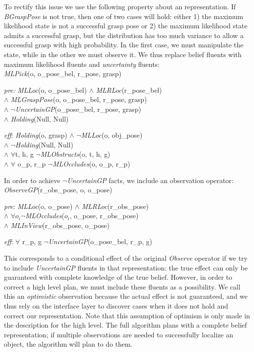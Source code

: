 To rectify this issue we use the following property about an \mld{}
representation. If \emph{BGraspPose} is not true, then one of two
cases will hold: either 1) the maximum likelihood state is not a
successful grasp pose or 2) the maximum likelihood state admits a
successful grasp, but the distribution has too much variance to allow
a successful grasp with high probability. In the first case, we must
manipulate the state, while in the other we must observe it. We
thus replace belief fluents with maximum likelihood fluents and
\emph{uncertainty} fluents:\\
\emph{MLPick}(o, o\_pose\_bel, r\_pose, grasp)
\begin{tightlist}
\item[\emph{pre:}] \emph{MLLoc}(o, o\_pose\_bel) $\wedge$
  \emph{MLRLoc}(r\_pose\_bel) \\$\wedge$ \emph{MLGraspPose}(o,
  o\_pose\_bel, r\_pose, grasp) \\$\wedge$
  $\lnot$\emph{UncertainGP}(o\_pose\_bel, r\_pose, grasp)\\$\wedge$
  \emph{Holding}(Null, Null)
\item[\emph{eff}:] \emph{Holding}(o, grasp) $\wedge$
  $\lnot$\emph{MLLoc}(o, obj\_pose) \\$\wedge$
  $\lnot$\emph{Holding}(Null, Null) \\$\wedge$ $\forall$t, h, g
  $\lnot$\emph{MLObstructs}(o, t, h, g)\\ $\wedge$ $\forall$ o\_p,
  r\_p $\lnot$\emph{MLOccludes}(o, o\_p, r\_p)
\end{tightlist}
In order to achieve $\lnot$\emph{UncertainGP} facts, we include an
observation operator:\\
\emph{ObserveGP}(r\_obs\_pose, o, o\_pose)
\begin{tightlist}
  \item[\emph{pre}:] \emph{MLLoc}(o, o\_pose) $\wedge$
    \emph{MLRLoc}(r\_obs\_pose) \\$\wedge$ $\forall o_i
    \lnot$\emph{MLOccludes}($o_i$, o\_pose, r\_obs\_pose) \\ $\wedge$
    \emph{MLInView}(r\_obs\_pose, o\_pose)
  \item[\emph{eff}:] $\forall$ r\_p, g $\lnot$\emph{UncertainGP}(o\_pose\_bel, r\_p, g)
\end{tightlist}
This corresponds to a conditional effect of the original
\emph{Observe} operator if we try to include \emph{UncertainGP}
fluents in that representation: the true effect can only be guaranteed
with complete knowledge of the true belief. However,
in order to correct a high level plan, we must include these fluents as a
possibility. We call this an \emph{optimistic} observation because the actual
effect is not guaranteed, and we thus rely on the interface layer to discover
cases when it does not hold and correct our representation. Note that
this assumption of optimism is only made in the description for the high
level. The full algorithm plans with a complete belief representation; if
multiple observations are needed to successfully localize an object, the algorithm
will plan to do them.

